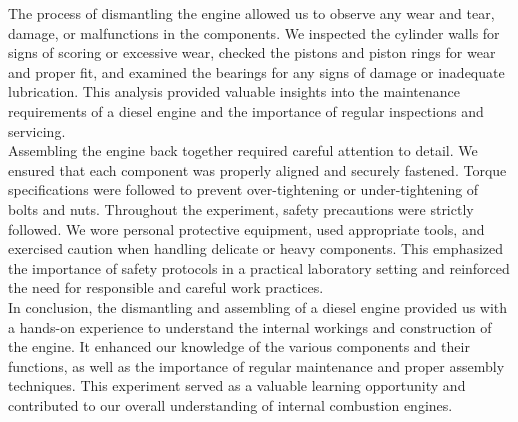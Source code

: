 \documentclass[12pt]{article}
\begin{document}
The process of dismantling the engine allowed us to observe any wear and tear, damage, or malfunctions in the components. We inspected the cylinder walls for signs of scoring or excessive wear, checked the pistons and piston rings for wear and proper fit, and examined the bearings for any signs of damage or inadequate lubrication. This analysis provided valuable insights into the maintenance requirements of a diesel engine and the importance of regular inspections and servicing.\\

Assembling the engine back together required careful attention to detail. We ensured that each component was properly aligned and securely fastened. Torque specifications were followed to prevent over-tightening or under-tightening of bolts and nuts. Throughout the experiment, safety precautions were strictly followed. We wore personal protective equipment, used appropriate tools, and exercised caution when handling delicate or heavy components. This emphasized the importance of safety protocols in a practical laboratory setting and reinforced the need for responsible and careful work practices.\\

In conclusion, the dismantling and assembling of a diesel engine provided us with a hands-on experience to understand the internal workings and construction of the engine. It enhanced our knowledge of the various components and their functions, as well as the importance of regular maintenance and proper assembly techniques. This experiment served as a valuable learning opportunity and contributed to our overall understanding of internal combustion engines.\\

\pagebreak
\end{document}
